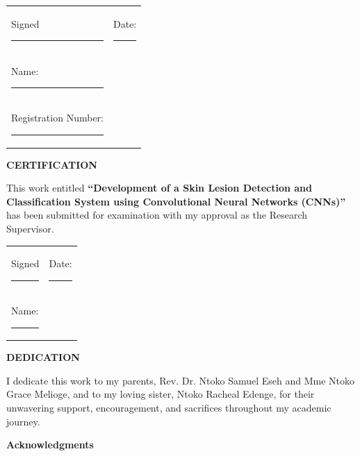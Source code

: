 \documentclass[
  12pt,
  oneside]{article}
\begin{document}
\vspace{1.2cm}

\begin{tabular}{ll}
Signed \rule{4cm}{0.15mm} \hspace{3cm} & Date: \rule{4cm}{0.15mm} \\ [0.5cm]
Name: \rule{4cm}{0.15mm} & \\ [0.5cm]
Registration Number: \rule{4cm}{0.15mm} & \\
\end{tabular}
\vfill
\clearpage
\thispagestyle{empty}
\begin{center}
\textbf{\large CERTIFICATION}
\end{center}

\vspace{1cm}

This work entitled \textbf{``Development of a Skin Lesion Detection and Classification System using Convolutional Neural Networks (CNNs)''} has been submitted for examination with my approval as the Research Supervisor.

\vspace{2cm}

\begin{tabular}{ll}
Signed \rule{4cm}{0.15mm} \hspace{3cm} & Date: \rule{4cm}{0.15mm} \\ [0.5cm]
Name: \rule{4cm}{0.15mm} & \\
\end{tabular}
\clearpage

\thispagestyle{empty}
\begin{center}
\textbf{\large DEDICATION}
\end{center}

\vspace{2cm} %

I dedicate this work to my parents, Rev. Dr. Ntoko Samuel Eseh and Mme Ntoko Grace Melioge, and to my loving sister, Ntoko Racheal Edenge, for their unwavering support, encouragement, and sacrifices throughout my academic journey.

\vfill %
\clearpage

\thispagestyle{empty}
\begin{center}
\textbf{\large Acknowledgments}
\end{center}

\vspace{2cm} %
\end{document}
